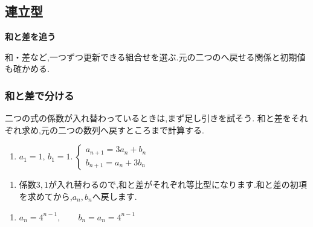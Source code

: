 
\subsection{連立型}\label{節：連立型}
  \begin{bookpoint}
    \textbf{和と差を追う}\par
    和・差など,一つずつ更新できる組合せを選ぶ.元の二つのへ戻せる関係と初期値も確かめる.
  \end{bookpoint}
  \subsubsection{和と差で分ける}
    二つの式の係数が入れ替わっているときは,まず足し引きを試そう.
    和と差をそれぞれ求め,元の二つの数列へ戻すところまで計算する.

    \noindent {}\par\nobreak
    \begin{enumerate}[label=(\arabic*),parsep=3pt,format=\bookitemlink{example-system-1}{problem}{answer}]
      \item $\displaystyle a_1=1,\,b_1=1.\ \begin{cases}a_{n+1}=3a_n+b_n\\ b_{n+1}=a_n+3b_n\end{cases}$
    \end{enumerate}

    \noindent {}\par\nobreak
    \begin{enumerate}[label=(\arabic*),parsep=3pt,format=\bookitemlink{example-system-1}{hint}{problem}]
      \item 係数$3,1$が入れ替わるので,和と差がそれぞれ等比型になります.和と差の初項を求めてから,$a_n,b_n$へ戻します.
    \end{enumerate}

    \noindent {}\par\nobreak
    \begin{enumerate}[label=(\arabic*),parsep=3pt,format=\bookitemlink{example-system-1}{answer}{problem}]
      \item $\displaystyle a_n=4^{n-1},\qquad b_n=a_n=4^{n-1}$
    \end{enumerate}

